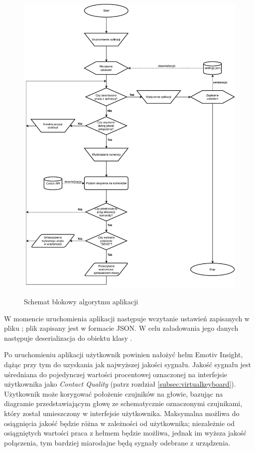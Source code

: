 \documentclass[skorowidz,skroty]{dyplomWEZUT}
\begin{document}
\begin{figure}
	\centering\includegraphics[height=\textheight,width=\textwidth,keepaspectratio]{graphic/flowchart.pdf}\\
	\caption{Schemat blokowy algorytmu aplikacji\label{fig:algorithm}}
\end{figure}

W momencie uruchomienia aplikacji następuje wczytanie ustawień zapisanych w pliku ; plik zapisany jest w formacie JSON. W celu załadowania jego danych następuje deserializacja do obiektu klasy .

Po uruchomieniu aplikacji użytkownik powinien nałożyć hełm Emotiv Insight, dążąc przy tym do uzyskania jak najwyższej jakości sygnału. Jakość sygnału jest uśredniana do pojedynczej wartości procentowej oznaczonej na interfejsie użytkownika jako \textit{Contact Quality} (patrz rozdział \vref{subsec:virtualkeyboard}). Użytkownik może korygować położenie czujników na głowie, bazując na diagramie przedstawiającym głowę ze schematycznie oznaczonymi czujnikami, który został umieszczony w interfejsie użytkownika. Maksymalna możliwa do osiągnięcia jakość będzie różna w zależności od użytkownika; niezależnie od osiągniętych wartości praca z hełmem będzie możliwa, jednak im wyższa jakość połączenia, tym bardziej miarodajne będą sygnały odebrane z urządzenia.
\end{document}
